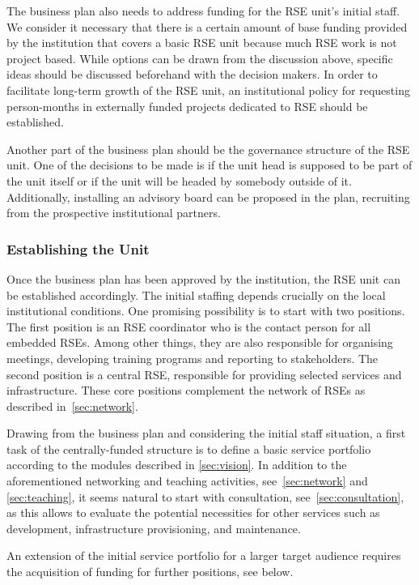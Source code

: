 \documentclass[a4paper]{article}
\begin{document}
The business plan also needs to address funding for the RSE unit's initial staff.
We consider it necessary that there is a certain amount of base funding provided by the institution that covers a basic RSE unit because much RSE work is not project based.
While options can be drawn from the discussion above, specific ideas should be discussed beforehand with the decision makers.
In order to facilitate long-term growth of the RSE unit, an institutional policy for requesting person-months in externally funded projects dedicated to RSE should be established.

Another part of the business plan should be the governance structure of the RSE unit.
One of the decisions to be made is if the unit head is supposed to be part of the unit itself or if the unit will be headed by somebody outside of it.
Additionally, installing an advisory board can be proposed in the plan, recruiting from the prospective institutional partners.

\subsubsection{Establishing the Unit}
Once the business plan has been approved by the institution, the RSE unit can be established accordingly.
The initial staffing depends crucially on the local institutional conditions.
One promising possibility is to start with two positions.
The first position is an RSE coordinator who is the contact person for all embedded RSEs.
Among other things, they are also responsible for organising meetings, developing training programs and reporting to stakeholders.
The second position is a central RSE, responsible for providing selected services and infrastructure.
These core positions complement the network of RSEs as described in~\autoref{sec:network}.

Drawing from the business plan and considering the initial staff situation, a first task of the centrally-funded structure is to define a basic service portfolio according to the modules described in \autoref{sec:vision}.
In addition to the aforementioned networking and teaching activities, see~\autoref{sec:network} and \autoref{sec:teaching}, it seems natural to start with consultation, see~\autoref{sec:consultation},
  as this allows to evaluate the potential necessities for other services such as development, infrastructure provisioning, and maintenance.

An extension of the initial service portfolio for a larger target audience requires the acquisition of funding for further positions, see below.
\end{document}

